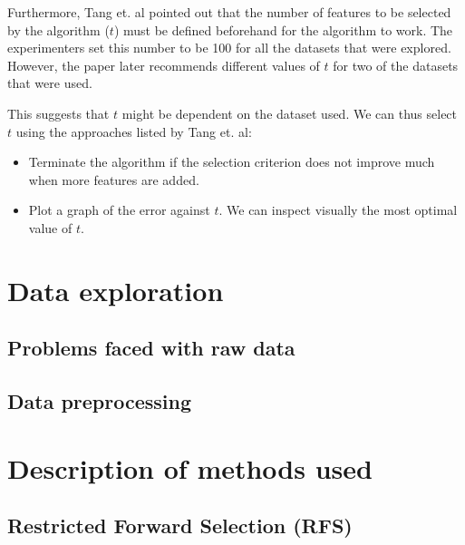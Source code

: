 \documentclass[12pt, twoside, a4paper]{article}
\begin{document}
Furthermore, Tang et. al pointed out that the number of features to be selected by the algorithm ($t$) must be defined beforehand for the algorithm to work. The experimenters set this number to be 100 for all the datasets that were explored. However, the paper later recommends different values of $t$ for two of the datasets that were used.

This suggests that $t$ might be dependent on the dataset used. We can thus select $t$ using the approaches listed by Tang et. al:
\begin{itemize}
\item Terminate the algorithm if the selection criterion does not improve much when more features are added.
\item Plot a graph of the error against $t$. We can inspect visually the most optimal value of $t$.
\end{itemize}

\section{Data exploration}

\subsection{Problems faced with raw data}

\subsection{Data preprocessing}

\section{Description of methods used}

\subsection{Restricted Forward Selection (RFS)} \label{body:rfs}
\end{document}
